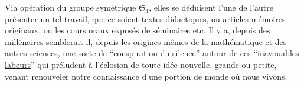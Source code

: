 Via opération du groupe symétrique $\mathfrak S_4$, elles se déduisent l'une de l'autre
présenter un tel travail, que ce soient 
 textes didactiques, 
ou  articles 
mémoires\deleted{\unsure{,}}  originaux, ou les  cours oraux
 exposés de séminaires etc.
Il y a, depuis des millénaires semblerait-il, depuis les origines mêmes de
la mathématique et des autres sciences, 
une sorte de ``conspiration du silence'' autour de ces 
``\uline{inavouables} \uline{labeurs}'' qui préludent à l'éclosion de toute idée nouvelle,
grande ou petite, venant renouveler notre connaissance d'une portion de monde où nous vivons.

